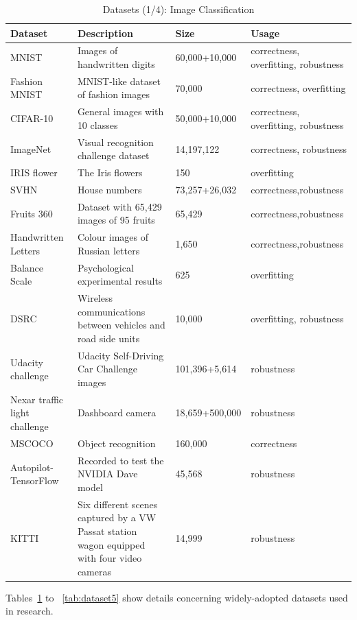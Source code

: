 \label{sec:dataset}
\begin{table}[h!]\small
	\center
	\caption{\label{tab:dataset1}Datasets (1/4): Image Classification}
	\begin{tabular}{p{3.9cm}| p{7.5cm}| p{2cm}| p{2.8cm}}
		\toprule
		\textbf{Dataset}&\textbf{Description}&\textbf{Size}&\textbf{Usage}\\ \midrule 
		MNIST~&Images of handwritten digits&60,000+10,000&correctness, overfitting, robustness \\ \midrule
		Fashion MNIST~&MNIST-like dataset of fashion images&70,000&correctness, overfitting\\ \midrule
		CIFAR-10~&General images with 10 classes&50,000+10,000&correctness, overfitting, robustness\\ \midrule
		ImageNet~&Visual recognition challenge dataset &14,197,122&correctness, robustness\\ \midrule
		IRIS flower~&The Iris flowers&150&overfitting\\ \midrule
		SVHN~&House numbers&73,257+26,032&correctness,robustness\\ \midrule
		Fruits 360~&Dataset with 65,429 images of 95 fruits&65,429&correctness,robustness\\ \midrule
		Handwritten Letters~&Colour images of Russian letters&1,650&correctness,robustness\\ \midrule
		Balance Scale~&Psychological experimental results&625&overfitting\\ \midrule
		DSRC~&Wireless communications between vehicles and road side units&10,000&overfitting, robustness\\ \midrule
		Udacity challenge~&Udacity Self-Driving Car Challenge images &101,396+5,614&robustness\\ \midrule
		Nexar traffic light challenge~&Dashboard camera& 18,659+500,000&robustness\\ \midrule
		MSCOCO~&Object recognition 	&160,000&correctness\\ \midrule
		Autopilot-TensorFlow~& Recorded to test the NVIDIA Dave model&45,568&robustness \\ \midrule
		KITTI~&Six different scenes
captured by a VW Passat station wagon equipped with four
video cameras	&14,999 &robustness \\  
		\bottomrule		
	\end{tabular}
\end{table}
Tables~\ref{tab:dataset1} to ~\ref{tab:dataset5} 
show details concerning widely-adopted datasets used in \mlt{} research.
